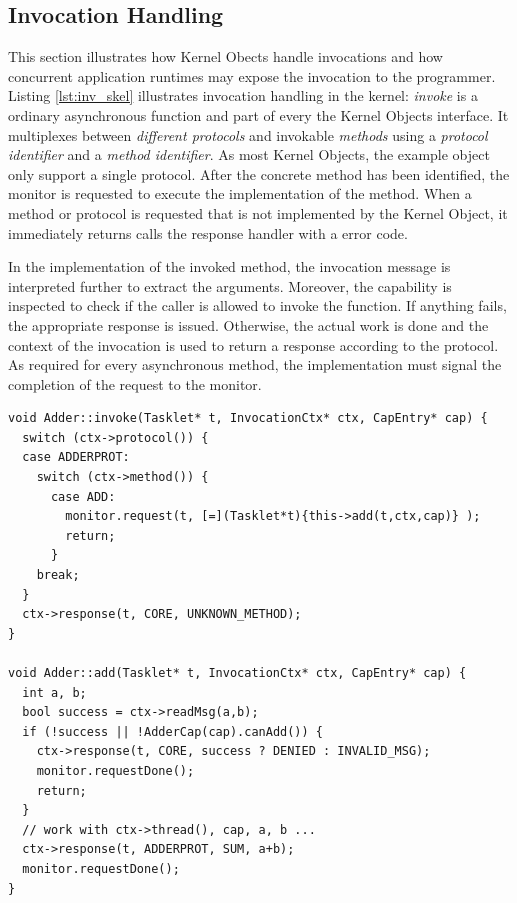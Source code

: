 \subsection{Invocation Handling}
\label{sec:invocation-handling}

This section illustrates how Kernel Obects handle invocations and how concurrent application runtimes may expose the invocation to the programmer.
Listing \ref{lst:inv_skel} illustrates invocation handling in the kernel: \emph{invoke} is a ordinary asynchronous function and part of every the Kernel Objects interface. It multiplexes between \emph{different protocols} and invokable \emph{methods} using a \emph{protocol identifier} and a \emph{method identifier}. As most Kernel Objects, the example object only support a single protocol. After the concrete method has been identified, the monitor is requested to execute the implementation of the method. When a method or protocol is requested that is not implemented by the Kernel Object, it immediately returns calls the response handler with a error code.

In the implementation of the invoked method, the invocation message is interpreted further to extract the arguments.
Moreover, the capability is inspected to check if the caller is allowed to invoke the function. If anything fails, the appropriate response  is issued. Otherwise, the actual work is done and the context of the invocation is used to return a response according to the protocol. As required for every asynchronous method, the implementation must signal the completion of the request to the monitor.

\begin{lstlisting}[float, label=lst:inv_skel, caption=Kernel-side dispatch and implementation of a method invocation.]
void Adder::invoke(Tasklet* t, InvocationCtx* ctx, CapEntry* cap) {
  switch (ctx->protocol()) {
  case ADDERPROT:
    switch (ctx->method()) {
      case ADD: 
        monitor.request(t, [=](Tasklet*t){this->add(t,ctx,cap)} );
        return;
      }
    break;
  }
  ctx->response(t, CORE, UNKNOWN_METHOD);
}

void Adder::add(Tasklet* t, InvocationCtx* ctx, CapEntry* cap) {
  int a, b;
  bool success = ctx->readMsg(a,b);
  if (!success || !AdderCap(cap).canAdd()) {
  	ctx->response(t, CORE, success ? DENIED : INVALID_MSG); 
  	monitor.requestDone();
  	return;
  }
  // work with ctx->thread(), cap, a, b ...
  ctx->response(t, ADDERPROT, SUM, a+b);
  monitor.requestDone();
}
\end{lstlisting}

